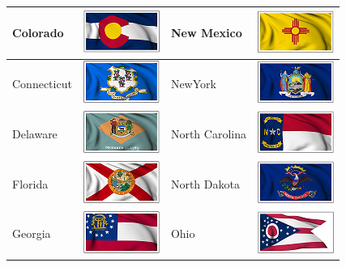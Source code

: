 \documentclass{ximera}
\begin{document}
\begin{center}
\begin{tabular}{|l|l|l|l|}
Colorado & \includegraphics{pics/StateFlags/Colorado.png} & New Mexico & \includegraphics{pics/StateFlags/NewMexico.png} \\\hline 



Connecticut & \includegraphics{pics/StateFlags/Connecticut.png} & NewYork & \includegraphics{pics/StateFlags/NewYork.png} \\\hline 
Delaware & \includegraphics{pics/StateFlags/Delaware.png} & North Carolina & \includegraphics{pics/StateFlags/NorthCarolina.png} \\\hline 
Florida & \includegraphics{pics/StateFlags/Florida.png} & North Dakota & \includegraphics{pics/StateFlags/NorthDakota.png} \\\hline 
Georgia & \includegraphics{pics/StateFlags/Georgia.png} & Ohio & \includegraphics{pics/StateFlags/Ohio.png} \\\hline 

\end{tabular}
\end{center}
\end{document}
